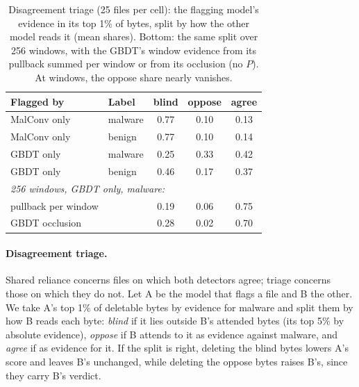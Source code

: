 \begin{table}[t]
  \centering
  \small
  \begin{tabular}{llccc}
    \toprule
    Flagged by & Label & blind & oppose & agree \\
    \midrule
    MalConv only & malware & 0.77 & 0.10 & 0.13 \\
    MalConv only & benign & 0.77 & 0.10 & 0.14 \\
    GBDT only & malware & 0.25 & 0.33 & 0.42 \\
    GBDT only & benign & 0.46 & 0.17 & 0.37 \\
    \midrule
    \multicolumn{5}{l}{\textit{256 windows, GBDT only, malware:}} \\
    \quad pullback per window & & 0.19 & 0.06 & 0.75 \\
    \quad GBDT occlusion & & 0.28 & 0.02 & 0.70 \\
    \bottomrule
  \end{tabular}
  \caption{Disagreement triage (25 files per cell): the flagging model's evidence in its top 1\% of bytes, split by how
  the other model reads it (mean shares). Bottom: the same split over 256 windows, with the GBDT's window evidence from
  its pullback summed per window or from its occlusion (no $P$). At windows, the oppose share nearly vanishes.}
  \label{tab:XML:Triage}
\end{table}

\paragraph{Disagreement triage.} Shared reliance concerns files on which both detectors agree; triage concerns those on
which they do not. Let A be the model that flags a file and B the other. We take A's top 1\% of deletable bytes by
evidence for malware and split them by how B reads each byte: \emph{blind} if it lies outside B's attended bytes (its
top 5\% by absolute evidence), \emph{oppose} if B attends to it as evidence against malware, and \emph{agree} if as
evidence for it. If the split is right, deleting the blind bytes lowers A's score and leaves B's unchanged, while
deleting the oppose bytes raises B's, since they carry B's verdict.


